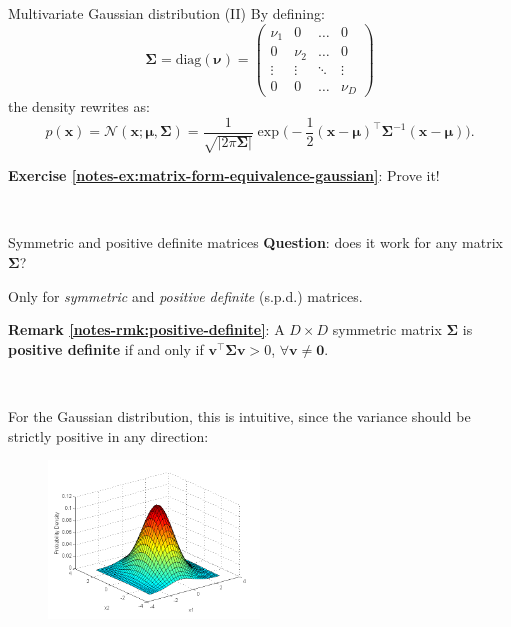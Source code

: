 \documentclass{beamer}
\newcommand{\bs}[1]{\boldsymbol{#1}}
\newcommand{\exercise}[2]{\noindent\colorbox{blue!10}{\parbox{0.995\textwidth}{\textbf{Exercise \ref{notes-ex:#1}}: #2}}\\}
\newcommand{\remark}[2]{\noindent\colorbox{red!10}{\parbox{0.995\textwidth}{\textbf{Remark \ref{notes-rmk:#1}}: #2}}\\}
\begin{document}
\begin{frame}{Multivariate Gaussian distribution (II)}
 By defining:
 \[\bs{\Sigma}=\textrm{diag}(\boldsymbol{\nu})=\left(\begin{array}{cccc}
 \nu_1 & 0 & \ldots & 0 \\
 0 & \nu_2 & \ldots & 0 \\
 \vdots & \vdots & \ddots & \vdots \\
 0 & 0 & \ldots & \nu_D
 \end{array}\right)
\]
 the density rewrites as:
 \[p(\mathbf{x}) = \mathcal{N}(\mathbf{x};\bs{\mu},\bs{\Sigma}) = \frac{1}{\sqrt{|2\pi\bs{\Sigma}|}}\exp\Big(-\frac{1}{2}(\bs{x}-\bs{\mu})^\top\bs{\Sigma}^{-1}(\bs{x}-\bs{\mu})\Big).\]
\exercise{matrix-form-equivalence-gaussian}{Prove it!}
\end{frame}

\begin{frame}{Symmetric and positive definite matrices}
 \textbf{Question}: does it work for any matrix $\bs{\Sigma}$?\vspace{3mm}

 Only for \textit{symmetric} and \textit{positive definite} (s.p.d.) matrices.\vspace{3mm}
 
 \remark{positive-definite}{A $D\times D$ symmetric matrix $\bs{\Sigma}$ is \textbf{positive definite} if and only if $\bs{v}^\top\bs{\Sigma}\bs{v} > 0$, $\forall \bs{v}\neq \bs{0}$.}\vspace{3mm}
 \pause

 For the Gaussian distribution, this is intuitive, since the variance should be strictly positive in any direction:\vspace{-5mm}
 \begin{figure}
 \centering
 \includegraphics[width=0.5\textwidth]{fig/multivariate_gaussian}
\end{figure}
 \end{frame}
\end{document}
